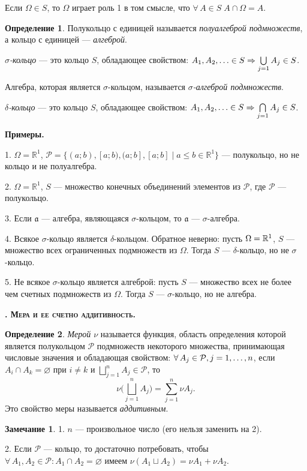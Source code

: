 \documentclass[12pt,titlepage]{article}
\newcounter{tema}
\renewcommand{\thetema}{\arabic{tema}}
\newcommand*{\tema}[1]{\vspace{10pt}
\begin{center}{\textbf{\refstepcounter{tema}
\textsc{\thetema. #1.}}}\vspace{7pt}
\end{center}}
\newcommand{\prim}{\vspace{5pt}\noindent\textbf{Примеры.}}
\theoremstyle{definition}
\newtheorem{defen}{Определение}[tema]
\newtheorem*{zam}{Замечание}
\newcommand*{\p}[1]{#1\nobreak\discretionary{}{\hbox{$\mathsurround=0pt #1$}}{}}
\begin{document}
Если $\Omega\in S$, то $\Omega$ играет роль 1 в том смысле, что
$\forall\, A\in S\; A\cap \Omega=A$.

\begin{defen}
Полукольцо с единицей называется \emph{полуалгеброй по\-дмножеств},
а кольцо с единицей --- \emph{алгеброй}.

\emph{$\sigma$-кольцо} --- это кольцо $S$, обладающее свойством:
$A_1,A_2,\ldots\in S\p\Rightarrow \bigcup\limits_{j=1} A_j\in S$.

Алгебра, которая является $\sigma$-кольцом, называется
\emph{$\sigma$-алгеброй подмножеств}.

\emph{$\delta$-кольцо} --- это кольцо $S$, обладающее свойством:
$A_1,A_2,\ldots\in S\p\Rightarrow \bigcap\limits_{j=1} A_j\in S$.
\end{defen}

\prim

1. $\Omega=\mathbb{R}^1$, $\mathcal{P}=\{(a;b), [a;b), (a;b],
[a;b]\mid a\leqslant b\in\mathbb{R}^1\}$ --- полукольцо, но не
кольцо и не полуалгебра.

2. $\Omega=\mathbb{R}^1$, $S$ --- множество конечных объединений
элементов из $\mathcal{P}$, где $\mathcal{P}$ --- полукольцо.

3. Если $\mathfrak{a}$ --- алгебра, являющаяся $\sigma$-кольцом, то
$\mathfrak{a}$ --- $\sigma$-алгебра.

4. Всякое $\sigma$-кольцо является $\delta$-кольцом. Обратное
неверно: пусть $\Omega\p=\mathbb{R}^1$, $S$ --- множество всех
ограниченных подмножеств из $\Omega$. Тогда $S$ --- $\delta$-кольцо,
но не $\sigma$-кольцо.

5. Не всякое $\sigma$-кольцо является алгеброй: пусть $S$ ---
множество всех не более чем счетных подмножеств из $\Omega$. Тогда
$S$ --- $\sigma$-кольцо, но не алгебра.

\tema{Мера и ее счетно аддитивность}

\begin{defen}
\emph{Мерой $\nu$} называется функция, область определения которой
является полукольцом $\mathcal{P}$ подмножеств некоторого множества,
принимающая числовые значения и обладающая свойством: $\forall\,
A_j\p\in\mathcal{P}, j=1,\ldots,n$, если $A_i\cap A_k=\varnothing$
при $i\neq k$ и $\bigsqcup\limits_{j=1}^n A_j\in\mathcal{P}$, то
$$\nu\Big(\bigsqcup\limits_{j=1}^n A_j\Big)=\sum\limits_{j=1}^n \nu
A_j.$$ Это свойство меры называется \emph{аддитивным}.
\end{defen}

\begin{zam}
1. $n$ --- произвольное число (его нельзя заменить на 2).

2. Если $\mathcal{P}$ --- кольцо, то достаточно потребовать, чтобы
$\forall\, A_1, A_2\in\mathcal{P}: A_1\cap A_2=\varnothing$ имеем
$\nu(A_1\sqcup A_2)=\nu A_1+\nu A_2$.
\end{zam}
\end{document}
